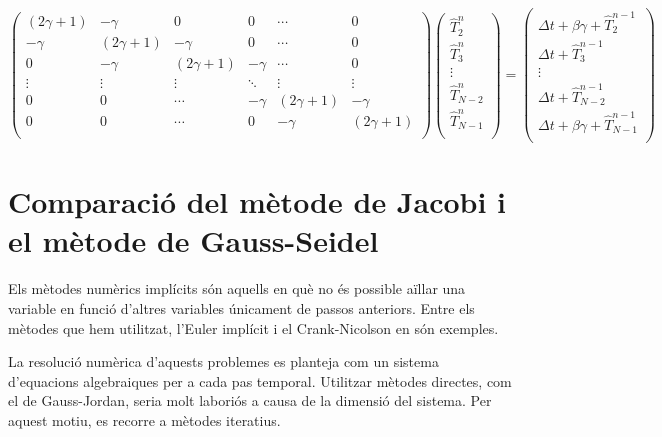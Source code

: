 \documentclass[11pt]{article}
\begin{document}
\begin{equation}
  \begin{pmatrix}
    (2\gamma + {1}) & {-\gamma} & {0} & {0} & \cdots & {0} \\
    {-\gamma} & (2\gamma + {1}) & {-\gamma} & {0} & \cdots & {0} \\
    {0} & {-\gamma} & (2\gamma + {1}) & {-\gamma} & \cdots & {0} \\
    \vdots & \vdots & \vdots & \ddots & \vdots & \vdots \\
    {0} & {0} & \cdots & {-\gamma} & (2\gamma + {1}) & {-\gamma} \\
    {0} & {0} & \cdots & {0} & {-\gamma} & (2\gamma + {1}) \\
  \end{pmatrix}
  \begin{pmatrix}
    \hat{T}_{2}^{n} \\
    \hat{T}_{3}^{n} \\
    \vdots \\
    \hat{T}_{N-2}^{n} \\
    \hat{T}_{N-1}^{n} \\
  \end{pmatrix}
  =
  \begin{pmatrix}
    \Delta t + \beta\gamma + \hat{T}^{n-1}_2 \\
    \Delta t + \hat{T}^{n-1}_3 \\
    \vdots \\
    \Delta t + \hat{T}^{n-1}_{N-2} \\
    \Delta t + \beta\gamma + \hat{T}^{n-1}_{N-1} \\
  \end{pmatrix}
  \label{matriu implicit}
\end{equation}



\section{Comparació del mètode de Jacobi i el mètode de Gauss-Seidel}
\label{subsec: comparacio jacobi gs}

Els mètodes numèrics implícits són aquells en què no és possible aïllar una variable en funció d'altres variables únicament de passos anteriors. Entre els mètodes que hem utilitzat, l’Euler implícit i el Crank-Nicolson en són exemples.

La resolució numèrica d’aquests problemes es planteja com un sistema d’equacions algebraiques per a cada pas temporal. Utilitzar mètodes directes, com el de Gauss-Jordan, seria molt laboriós a causa de la dimensió del sistema. Per aquest motiu, es recorre a mètodes iteratius.
\end{document}
